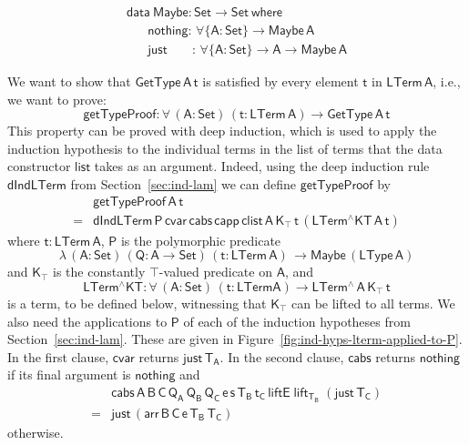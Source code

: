 \documentclass[sigplan,10pt,anonymous,review]{acmart}
\begin{document}
\begin{equation}\label{eq:maybe}
\begin{array}{l}
\mathsf{data\ Maybe : Set \to Set\ where}\\
\mathsf{\;\;\;\;\;\;nothing :\,  \forall \{A : Set\} \to Maybe\,A}\\
\mathsf{\;\;\;\;\;\;just\;\;\;\;\;\;\; :\,  \forall \{A : Set\} \to A \to Maybe\,A}
\end{array}
\end{equation}

\noindent
We want to show that $\mathsf{GetType\,A\,t}$ is satisfied by every
element $\mathsf{t}$ in $\mathsf{LTerm\,A}$, i.e., we want to prove:
\[ \mathsf{getTypeProof : \forall \, (A : Set)\, (t : LTerm\,A) \to
   GetType \,A \,t}\] This property can be proved with deep
induction, which is used to apply the induction hypothesis to the
individual terms in the list of terms that the data constructor
$\mathsf{list}$ takes as an argument. Indeed, using the deep induction
rule $\mathsf{dIndLTerm}$ from Section~\ref{sec:ind-lam} we can define
$\mathsf{getTypeProof}$ by
\[\begin{array}{ll}
 & \mathsf{getTypeProof \,A \,t}\\
= & \mathsf{dIndLTerm\, P \, cvar\, cabs\, capp\, clist\, A\, K_\top\, t\,
  (LTerm^\wedge KT\, A\, t) }
\end{array}\] where $\mathsf{t : LTerm\,A}$,
$\mathsf{P}$ is the polymorphic predicate \[\mathsf{ \lambda \, (A:
  Set)\, (Q : A \to Set)\, (t : LTerm\,A)\, \to Maybe \, (LType \,
  A)}\] and $\mathsf{K_\top}$ is the constantly $\mathsf{\top}$-valued
predicate on $\mathsf{A}$, and \[\mathsf{LTerm^\wedge KT : \forall\,
  (A : Set)\, (t : LTerm A) \to LTerm^{\wedge}\, A\, K_\top\,t}\] is a
term, to be defined below, witnessing that $\mathsf{K_\top}$ can be
lifted to all terms. We also need the applications to $\mathsf{P}$ of
each of the induction hypotheses from Section~\ref{sec:ind-lam}. These
are given in Figure~\ref{fig:ind-hyps-lterm-applied-to-P}. In the first
clause, $\mathsf{cvar}$ returns $\mathsf{just\,T_A}$.  In the second
clause, $\mathsf{cabs}$ returns $\mathsf{nothing}$ if its final
argument is $\mathsf{nothing}$ and
\[\begin{array}{ll}
 & \!\!\mathsf{cabs\, A \,B \,C \,Q_A\, Q_B \,Q_C\, e \,s \,T_B\, t_C\, liftE\;
  lift_{T_B}\; (just \,T_C)}\\
  = & \!\!\mathsf{just \, (arr\, B\, C\, e\, T_B \,T_C)}
\end{array}\] otherwise.
\end{document}

